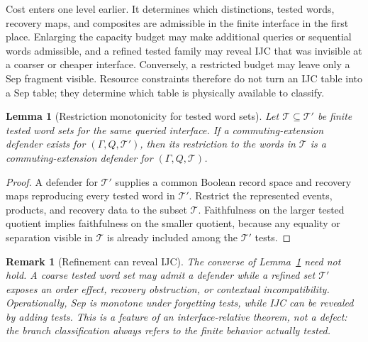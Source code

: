 \documentclass[11pt]{article}
\newtheorem{lemma}[theorem]{Lemma}
\newtheorem{remark}[theorem]{Remark}
\begin{document}
Cost enters one level earlier.  It determines which distinctions,
tested words, recovery maps, and composites are admissible in the
finite interface in the first place.  Enlarging the capacity budget
may make additional queries or sequential words admissible, and a
refined tested family may reveal IJC that was invisible at a coarser
or cheaper interface.  Conversely, a restricted budget may leave
only a Sep fragment visible.  Resource constraints therefore do not
turn an IJC table into a Sep table; they determine which table is
physically available to classify.

\begin{lemma}[Restriction monotonicity for tested word sets]\label{lem:tested-restriction-monotonicity}
Let $\mathcal T\subseteq\mathcal T'$ be finite tested word sets for the same queried interface.  If a commuting-extension defender exists for $(\Gamma,Q,\mathcal T')$, then its restriction to the words in $\mathcal T$ is a commuting-extension defender for $(\Gamma,Q,\mathcal T)$.
\end{lemma}
\begin{proof}
A defender for $\mathcal T'$ supplies a common Boolean record space and recovery maps reproducing every tested word in $\mathcal T'$.  Restrict the represented events, products, and recovery data to the subset $\mathcal T$.  Faithfulness on the larger tested quotient implies faithfulness on the smaller quotient, because any equality or separation visible in $\mathcal T$ is already included among the $\mathcal T'$ tests.
\end{proof}

\begin{remark}[Refinement can reveal IJC]\label{rem:refinement-can-reveal-ijc}
The converse of Lemma~\ref{lem:tested-restriction-monotonicity} need not hold.  A coarse tested word set may admit a defender while a refined set $\mathcal T'$ exposes an order effect, recovery obstruction, or contextual incompatibility.  Operationally, Sep is monotone under forgetting tests, while IJC can be revealed by adding tests.  This is a feature of an interface-relative theorem, not a defect: the branch classification always refers to the finite behavior actually tested.
\end{remark}
\end{document}
